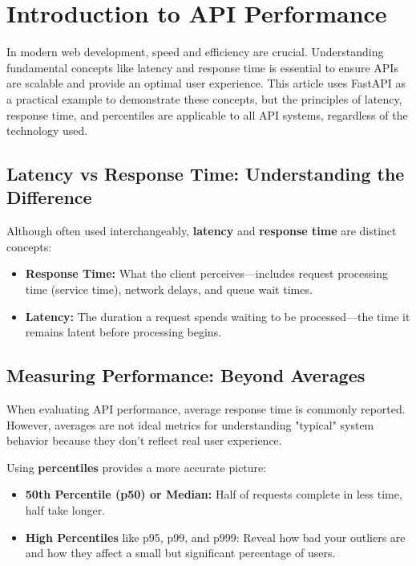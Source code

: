 \documentclass[12pt,letterpaper]{article}
\begin{document}
\setlength{\parindent}{0pt}
\begin{titlepage}
    \titlepagecontents
\end{titlepage}

\section{Introduction to API Performance}

In modern web development, speed and efficiency are crucial. Understanding fundamental concepts like latency and response time is essential to ensure APIs are scalable and provide an optimal user experience. This article uses FastAPI as a practical example to demonstrate these concepts, but the principles of latency, response time, and percentiles are applicable to all API systems, regardless of the technology used.

\subsection{Latency vs Response Time: Understanding the Difference}

Although often used interchangeably, \textbf{\textcolor{accentColor}{latency}} and \textbf{\textcolor{accentColor}{response time}} are distinct concepts:

\begin{itemize}
    \item \textbf{\textcolor{pythonBlue}{Response Time:}} What the client perceives—includes request processing time (service time), network delays, and queue wait times.
    \item \textbf{\textcolor{pythonBlue}{Latency:}} The duration a request spends waiting to be processed—the time it remains latent before processing begins.
\end{itemize}

\subsection{Measuring Performance: Beyond Averages}

When evaluating API performance, average response time is commonly reported. However, averages are not ideal metrics for understanding "typical" system behavior because they don't reflect real user experience.

Using \textbf{\textcolor{accentColor}{percentiles}} provides a more accurate picture:

\begin{itemize}
    \item \textbf{\textcolor{pythonBlue}{50th Percentile (p50) or Median:}} Half of requests complete in less time, half take longer.
    \item \textbf{\textcolor{pythonBlue}{High Percentiles}} like p95, p99, and p999: Reveal how bad your outliers are and how they affect a small but significant percentage of users.
\end{itemize}
\end{document}
